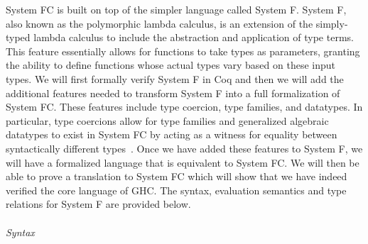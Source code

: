\documentclass{sig-alternate}
\begin{document}
System FC is built on top of the simpler language called System F. System F, also known as the polymorphic lambda calculus, is an extension of the simply-typed lambda calculus to include the abstraction and application of type terms. This feature essentially allows for functions to take types as parameters, granting the ability to define functions whose actual types vary based on these input types. We will first formally verify System F in Coq and then we will add the additional features needed to transform System F into a full formalization of System FC. These features include type coercion, type families, and datatypes. In particular, type coercions allow for type families and generalized algebraic datatypes to exist in System FC by acting as a witness for equality between syntactically different types~\cite{conf/tldi/SulzmannCJD07}.  Once we have added these features to System F, we will have a formalized language that is equivalent to System FC. We will then be able to prove a translation to System FC which will show that we have indeed verified the core language of GHC. The syntax, evaluation semantics and type relations for System F are provided below.\\\\
\newcommand\mybox[2][]{\tikz[overlay]\node[fill=blue!20,inner sep=2pt, anchor=text, rectangle, rounded corners=1mm,#1] {#2};\phantom{#2}}
{\large\it Syntax}\\
\end{document}
